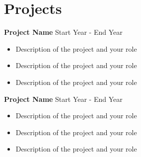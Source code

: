 \documentclass[a4paper,10pt]{article}
\begin{document}
\section{Projects}
\textbf{\color{myBlue}Project Name} \hfill Start Year - End Year
\begin{itemize}[leftmargin=*]
\setlength\itemsep{0em}
    \item Description of the project and your role
    \item Description of the project and your role
    \item Description of the project and your role
\end{itemize}
\smallskip
\textbf{\color{myBlue}Project Name} \hfill Start Year - End Year
\begin{itemize}[leftmargin=*]
\setlength\itemsep{0em}
    \item Description of the project and your role
    \item Description of the project and your role
    \item Description of the project and your role
\end{itemize}
\end{document}
